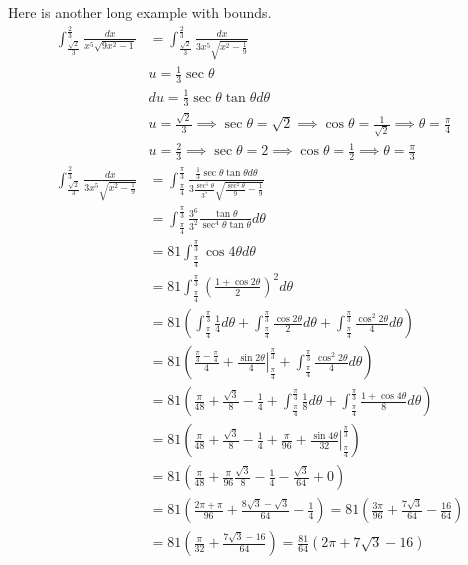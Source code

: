 \documentclass[fleqn]{report}
\begin{document}
\begin{example}
Here is another long example with bounds. 
\begin{align*}
\int_{\frac{\sqrt{2}}{3}}^{\frac{2}{3}}
\frac{dx}{x^5\sqrt{9x^2-1}} &
= \int_{\frac{\sqrt{2}}{3}}^{\frac{2}{3}} \frac{dx}{3x^5\sqrt{x^2 -
\frac{1}{9}}} \\
& u = \frac{1}{3} \sec \theta \\
& du = \frac{1}{3} \sec \theta \tan \theta d \theta \\
& u = \frac{\sqrt{2}}{3} \implies \sec \theta = \sqrt{2}
\implies \cos \theta = \frac{1}{\sqrt{2}} \implies \theta =
\frac{\pi}{4} \\
& u = \frac{2}{3} \implies \sec \theta = 2 \implies \cos \theta
= \frac{1}{2} \implies \theta = \frac{\pi}{3} \\
\int_{\frac{\sqrt{2}}{3}}^{\frac{2}{3}} \frac{dx}{3x^5
\sqrt{x^2 - \frac{1}{9}}} 
& = \int_{\frac{\pi}{4}}^{\frac{\pi}{3}} \frac{\frac{1}{3} \sec
\theta \tan \theta d\theta}{3 \frac{\sec^5 \theta}{3^5}
\sqrt{\frac{\sec^2 \theta}{9} - \frac{1}{9}}} \\
& = \int_{\frac{\pi}{4}}^{\frac{\pi}{3}} \frac{3^6}{3^2}
\frac{\tan \theta}{\sec^4 \theta \tan \theta} d \theta \\
& = 81 \int_{\frac{\pi}{4}}^{\frac{\pi}{3}} \cos 4 \theta d
\theta \\
& = 81 \int_{\frac{\pi}{4}}^{\frac{\pi}{3}} \left( \frac{1 +
\cos 2\theta}{2} \right)^2 d \theta \\
& = 81 \left( \int_{\frac{\pi}{4}}^{\frac{\pi}{3}} \frac{1}{4}
d\theta + \int_{\frac{\pi}{4}}^{\frac{\pi}{3}} \frac{\cos
2\theta}{2} d \theta + \int_{\frac{\pi}{4}}^{\frac{\pi}{3}}
\frac{\cos^2 2 \theta}{4} d\theta \right) \\
& = 81 \left( \frac{\frac{\pi}{3} - \frac{\pi}{4}}{4} + \left.
\frac{\sin 2\theta}{4} \right|_{\frac{\pi}{4}}^{\frac{\pi}{3}}
+ \int_{\frac{\pi}{4}}^{\frac{\pi}{3}} \frac{\cos^2 2\theta}{4}
d \theta \right) \\
& = 81 \left(\frac{\pi}{48} + \frac{\sqrt{3}}{8} - \frac{1}{4} + 
\int_{\frac{\pi}{4}}^{\frac{\pi}{3}} \frac{1}{8} d\theta +
\int_{\frac{\pi}{4}}^{\frac{\pi}{3}} \frac{1 + \cos 4\theta}{8}
d\theta \right)\\
& = 81 \left(\frac{\pi}{48} + \frac{\sqrt{3}}{8} - \frac{1}{4} +
\frac{\pi}{96} + \left. \frac{\sin 4\theta}{32}
\right|_{\frac{\pi}{4}}^{\frac{\pi}{3}} \right) \\
& = 81 \left(\frac{\pi}{48} + \frac{\pi}{96} \frac{\sqrt{3}}{8}
- \frac{1}{4} - \frac{\sqrt{3}}{64} + 0 \right)\\ 
& = 81 \left( \frac{2\pi + \pi}{96} + \frac{8\sqrt{3} -
\sqrt{3}}{64} - \frac{1}{4} \right) = 81 \left( \frac{3\pi}{96}
+ \frac{7\sqrt{3}}{64} - \frac{16}{64} \right) \\
& = 81 \left( \frac{\pi}{32} + \frac{7\sqrt{3} - 16}{64} \right)
= \frac{81}{64} ( 2\pi + 7\sqrt{3} - 16)
\end{align*}
\end{example}
\end{document}
